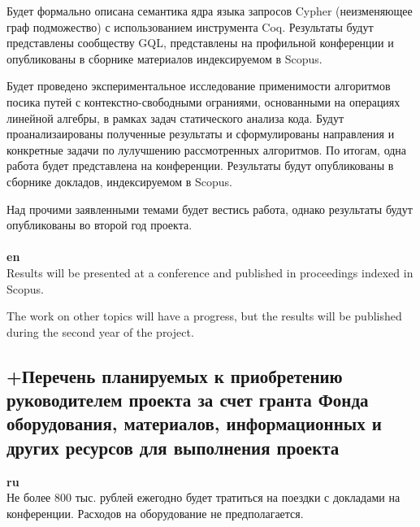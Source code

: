 \documentclass[12pt]{article}  %
\theoremstyle{remark}
\begin{document}
Будет формально описана семантика ядра языка запросов Cypher (неизменяющее граф подможество) с использованием инструмента Coq. Результаты будут представлены сообществу GQL, представлены на профильной конференции и опубликованы в сборнике материалов индексируемом в Scopus. 

Будет проведено экспериментальное исследование применимости алгоритмов посика путей с контекстно-свободными ограниями, основанными на операциях линейной алгебры, в рамках задач статического анализа кода. Будут проанализаированы полученные результаты и сформулированы направления и конкретные задачи по лулучшению рассмотренных алгоритмов. По итогам, одна работа будет представлена на конференции. Результаты будут опубликованы в сборнике докладов, индексируемом в Scopus.

Над прочими заявленными темами будет вестись работа, однако результаты будут опубликованы во второй год проекта.
\\
\\
\textbf{en}\\
Results will be presented at a conference and published in proceedings indexed in Scopus.

The work on other topics will have a progress, but the results will be published during the second year of the project.

\subsection{+Перечень планируемых к приобретению руководителем проекта за счет гранта Фонда оборудования, материалов, информационных и других ресурсов для выполнения проекта}

\textbf{ru}\\
%
Не более 800 тыс. рублей ежегодно будет тратиться на поездки с докладами на конференции. Расходов на оборудование не предполагается.
\end{document}
